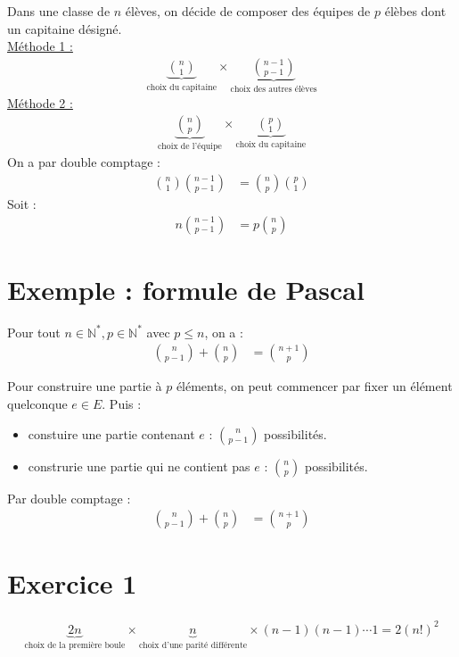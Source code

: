 \documentclass[../main.tex]{subfiles}
\begin{document}
\noindent Dans une classe de $n$ élèves, on décide de composer des équipes de $p$ élèbes dont un capitaine désigné. \\
\underline{Méthode 1 :} \\
\begin{align*}
    \underbrace{\binom{n}{1}}_{\text{choix du capitaine}}\times \underbrace{\binom{n-1}{p-1}}_{\text{choix des autres élèves}}
\end{align*}
\underline{Méthode 2 :} \\
\begin{align*}
    \underbrace{\binom{n}{p}}_{\text{choix de l'équipe}}\times \underbrace{\binom{p}{1}}_{\text{choix du capitaine}}
\end{align*}
On a par double comptage :
\begin{align*}
    \binom{n}{1} \binom{n-1}{p-1} &= \binom{n}{p} \binom{p}{1}
\end{align*}
Soit : 
\begin{align*}
    n\binom{n-1}{p-1} &= p\binom{n}{p}
\end{align*}

\section{Exemple : formule de Pascal}
\begin{tcolorbox}[title=Exemple 31.53, title filled=false, colframe=darkgreen, colback=darkgreen!10!white]
    Pour tout $n\in \mathbb{N}^*, p\in \mathbb{N}^*$ avec $p\leq n$, on a : 
    \begin{align*}
        \binom{n}{p-1} + \binom{n}{p} &= \binom{n+1}{p}
    \end{align*}
\end{tcolorbox}

\noindent Pour construire une partie à $p$ éléments, on peut commencer par fixer un élément quelconque $e\in E$. Puis : 
\begin{itemize}
    \item constuire une partie contenant $e$ : $\binom{n}{p-1}$ possibilités.
    \item construrie une partie qui ne contient pas $e$ : $\binom{n}{p}$ possibilités.
\end{itemize}
Par double comptage : 
\begin{align*}
    \binom{n}{p-1} + \binom{n}{p} &= \binom{n+1}{p}
\end{align*}

\section*{Exercice 1}
\begin{align*}
    \underbrace{2n}_{\text{choix de la première boule}} \times \underbrace{n}_{\text{choix d'une parité différente}}\times (n-1)(n-1) \cdots 1 = 2(n!)^2
\end{align*}
\end{document}
